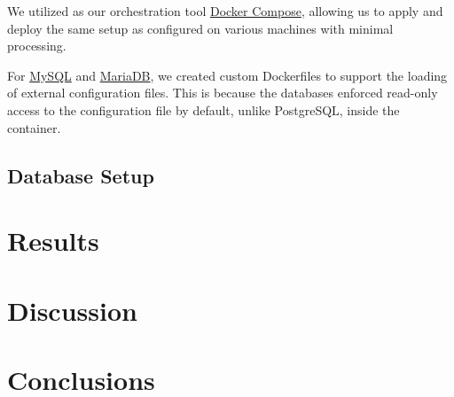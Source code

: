 We utilized as our orchestration tool \hyperref[sec:docker-compose]{Docker Compose}, allowing us to apply and deploy the same setup as configured on various machines with minimal processing.

For \hyperref[sec:dockerfile-mysql]{MySQL} and \hyperref[sec:dockerfile-mariadb]{MariaDB}, we created custom Dockerfiles to support the loading of external configuration files. This is because the databases enforced read-only access to the configuration file by default, unlike PostgreSQL, inside the container.

\subsection{Database Setup}
\label{sec:database-setup}

\section{Results}
\label{sec:results}

\section{Discussion}
\label{sec:discussion}

\section{Conclusions}
\label{sec:conclusions}
